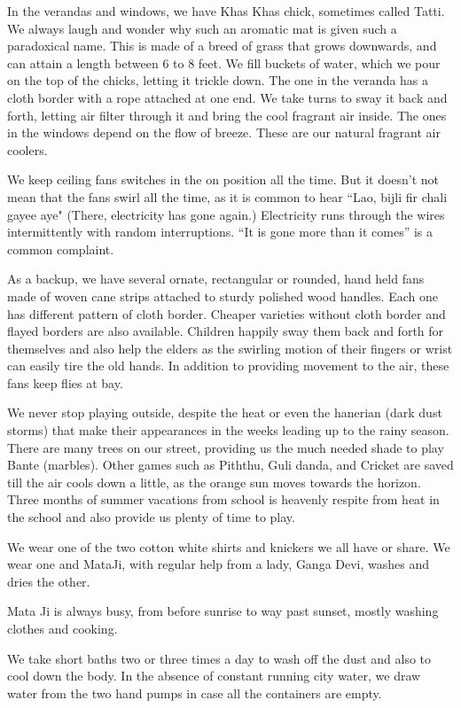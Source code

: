 In the verandas and windows, we have Khas Khas chick, sometimes called
Tatti. We always laugh and wonder why such an aromatic mat is given such
a paradoxical name. This is made of a breed of grass that grows downwards,
and can attain a length between 6 to 8 feet. We fill buckets of water,
which we pour on the top of the chicks, letting it trickle down. The one
in the veranda has a cloth border with a rope attached at one end. We take
turns to sway it back and forth, letting air filter through it and bring
the cool fragrant air inside. The ones in the windows depend on the flow
of breeze. These are our natural fragrant air coolers.
 
We keep ceiling fans switches in the on position all the time. But it
doesn’t not mean that the fans swirl all the time, as it is common to hear
“Lao, bijli fir chali gayee aye" (There, electricity has gone again.)
Electricity runs through the wires intermittently with random
interruptions. “It is gone more than it comes” is a common complaint. 
 
As a backup, we have several ornate, rectangular or rounded, hand held
fans made of woven cane strips attached to sturdy polished wood handles.
Each one has different pattern of cloth border. Cheaper varieties without
cloth border and flayed borders are also available. Children happily sway
them back and forth for themselves and also help the elders as the
swirling motion of their fingers or wrist can easily tire the old hands.
In addition to providing movement to the air, these fans keep flies at
bay. 
 
We never stop playing outside, despite the heat or even the hanerian (dark
dust storms) that make their appearances in the weeks leading up to the
rainy season. There are many trees on our street, providing us the much
needed shade to play Bante (marbles). Other games such as Piththu, Guli
danda, and Cricket are saved till the air cools down a little, as the
orange sun moves towards the horizon. Three months of summer vacations
from school is heavenly respite from heat in the school and also provide
us plenty of time to play. 
 
We wear one of the two cotton white shirts and knickers we all have or
share. We wear one and MataJi, with regular help from a lady, Ganga Devi,
washes and dries the other. 

Mata Ji is always busy, from before sunrise to way past sunset, mostly
washing clothes and cooking. 
 
We take short baths two or three times a day to wash off the dust and also
to cool down the body. In the absence of constant running city water, we
draw water from the two hand pumps in case all the containers are empty. 
 
